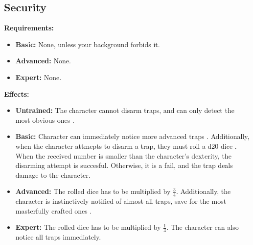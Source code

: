 \subsection{Security}
\begin{table}[!ht]
\centering
{}
\end{table}
\textbf{Requirements:}
\begin{itemize}
	\item \textbf{Basic:} None, unless your background forbids it.
	\item \textbf{Advanced:} None.
	\item \textbf{Expert:} None.
\end{itemize}
\textbf{Effects:}
\begin{itemize}
	\item \textbf{Untrained:} The character cannot disarm traps, and can only detect the most obvious ones .
	\item \textbf{Basic:} Character can immediately notice more advanced traps . Additionally, when the character attmepts to disarm a trap, they must roll a d20 dice . When the received number is smaller than the character's dexterity, the disarming attempt is succesful. Otherwise, it is a fail, and the trap deals damage to the character.
	\item \textbf{Advanced:} The rolled dice has to be multiplied by \( \frac{3}{4} \). Additionally, the character is instinctively notified of almost all traps, save for the most masterfully crafted ones .
	\item \textbf{Expert:} The rolled dice has to be multiplied by \( \frac{1}{4} \). The character can also notice all traps immediately.
\end{itemize}\newpage
